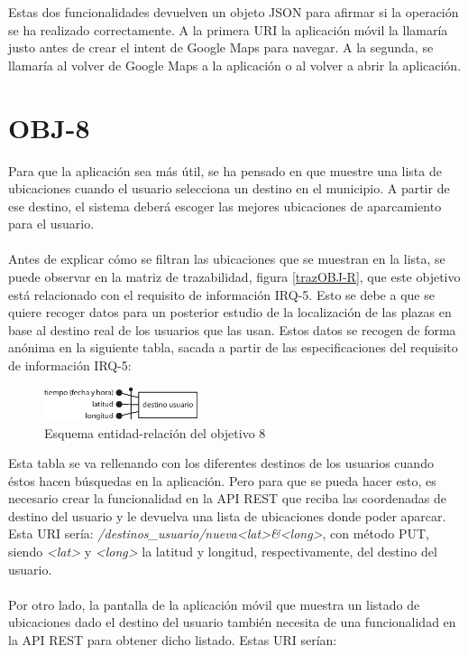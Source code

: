 Estas dos funcionalidades devuelven un objeto JSON para afirmar si la operación se ha realizado correctamente. A la primera URI la aplicación móvil la llamaría justo antes de crear el intent de Google Maps para navegar. A la segunda, se llamaría al volver de Google Maps a la aplicación o al volver a abrir la aplicación.

\section{OBJ-8}
Para que la aplicación sea más útil, se ha pensado en que muestre una lista de ubicaciones cuando el usuario selecciona un destino en el municipio. A partir de ese destino, el sistema deberá escoger las mejores ubicaciones de aparcamiento para el usuario.
\\\\
Antes de explicar cómo se filtran las ubicaciones que se muestran en la lista, se puede observar en la matriz de trazabilidad, figura \ref{trazOBJ-R}, que este objetivo está relacionado con el requisito de información IRQ-5. Esto se debe a que se quiere recoger datos para un posterior estudio de la localización de las plazas en base al destino real de los usuarios que las usan. Estos datos se recogen de forma anónima en la siguiente tabla, sacada a partir de las especificaciones del requisito de información IRQ-5:
\begin{figure}[H]
	\centering
	\includegraphics[width=0.4\textwidth]{imagenes/er_objetivo_8.eps}
	\caption{Esquema entidad-relación del objetivo 8}
	\label{er_objetivo_8}
\end{figure}
Esta tabla se va rellenando con los diferentes destinos de los usuarios cuando éstos hacen búsquedas en la aplicación. Pero para que se pueda hacer esto, es necesario crear la funcionalidad en la API REST que reciba las coordenadas de destino del usuario y le devuelva una lista de ubicaciones donde poder aparcar. Esta URI sería: \textit{/destinos\_usuario/nueva<lat>\&<long>}, con método PUT, siendo \textit{<lat>} y \textit{<long>} la latitud y longitud, respectivamente, del destino del usuario.
\\\\
\newpage
Por otro lado, la pantalla de la aplicación móvil que muestra un listado de ubicaciones dado el destino del usuario también necesita de una funcionalidad en la API REST para obtener dicho listado. Estas URI serían:
